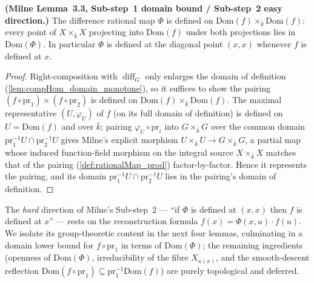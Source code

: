 \begin{lemma}\leanok
  \label{lem:difference_map_domain_lower_bound}
  \textbf{(Milne Lemma~3.3, Sub-step~1 domain bound / Sub-step~2 easy direction.)} The
  difference rational map \(\Phi\) is defined on \(\mathrm{Dom}(f) \times_{\bar k}
  \mathrm{Dom}(f)\): every point of \(X \times_{\bar k} X\) projecting into
  \(\mathrm{Dom}(f)\) under both projections lies in \(\mathrm{Dom}(\Phi)\). In
  particular \(\Phi\) is defined at the diagonal point \((x, x)\) whenever \(f\) is
  defined at \(x\).
\end{lemma}
\begin{proof}\leanok
  Right-composition with \(\operatorname{diff}_G\) only enlarges the domain of
  definition (\cref{lem:compHom_domain_monotone}), so it suffices to show the pairing
  \((f \circ \mathrm{pr}_1) \times (f \circ \mathrm{pr}_2)\) is defined on
  \(\mathrm{Dom}(f) \times_{\bar k} \mathrm{Dom}(f)\). The maximal representative
  \((U, \varphi_U)\) of \(f\) (on its full domain of definition) is defined on \(U =
  \mathrm{Dom}(f)\) and over \(\bar k\); pairing \(\varphi_U \circ \mathrm{pr}_i\) into
  \(G \times_{\bar k} G\) over the common domain
  \(\mathrm{pr}_1^{-1}U \cap \mathrm{pr}_2^{-1}U\) gives Milne's explicit morphism
  \(U \times_{\bar k} U \to G \times_{\bar k} G\), a partial map whose induced
  function-field morphism on the integral source \(X \times_{\bar k} X\) matches that of
  the pairing (\cref{def:rationalMap_prod}) factor-by-factor. Hence it represents the
  pairing, and its domain \(\mathrm{pr}_1^{-1}U \cap \mathrm{pr}_2^{-1}U\) lies in the
  pairing's domain of definition.
\end{proof}

The \emph{hard} direction of Milne's Sub-step~2 --- ``if \(\Phi\) is defined at
\((x,x)\) then \(f\) is defined at \(x\)'' --- rests on the reconstruction formula
\(f(x) = \Phi(x,u) \cdot f(u)\). We isolate its group-theoretic content in the next four
lemmas, culminating in a domain lower bound for \(f \circ \mathrm{pr}_1\) in terms of
\(\mathrm{Dom}(\Phi)\); the remaining ingredients (openness of \(\mathrm{Dom}(\Phi)\),
irreducibility of the fibre \(X_{\kappa(x)}\), and the smooth-descent reflection
\(\mathrm{Dom}(f \circ \mathrm{pr}_1) \subseteq \mathrm{pr}_1^{-1}\mathrm{Dom}(f)\)) are
purely topological and deferred.

